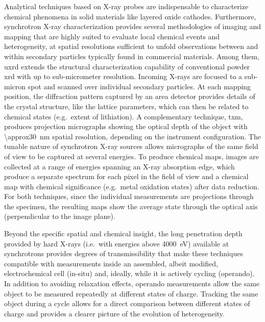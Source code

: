 \documentclass{article}
\begin{document}
Analytical techniques based on X-ray probes are indispensable to characterize chemical phenomena in solid materials like layered oxide cathodes\cite{doeff2017}. Furthermore, synchrotron X-ray characterization provides several methodologies of imaging and mapping that are highly suited to
evaluate local chemical events and heterogeneity\cite{wolf2017}, at spatial resolutions sufficient to unfold observations between and within secondary particles typically found in commercial materials. Among them, \gls{uxrd} extends the
structural characterization capability of conventional powder \gls{xrd} with
up to sub-micrometer resolution. Incoming X-rays are focused to a
sub-micron spot and scanned over individual secondary particles. At
each mapping position, the diffraction pattern captured by an area
detector provides details of the crystal structure, like the lattice
parameters, which can then be related to chemical states (e.g.\ extent
of lithiation). A complementary technique, \Gls{txm}, produces
projection micrographs showing the optical depth of the object with
\SI{\approx30}{nm} spatial resolution, depending on the instrument
configuration. The tunable nature of synchrotron X-ray sources allows
micrographs of the same field of view to be captured at several
energies. To produce chemical maps, images are collected at a range of
energies spanning an X-ray absorption edge, which produce a separate
spectrum for each pixel in the field of view and a chemical map with
chemical significance (e.g.\ metal oxidation states) after data
reduction. For both techniques, since the individual measurements are
projections through the specimen, the resulting maps show the average
state through the optical axis (perpendicular to the image plane).

Beyond the specific spatial and chemical insight, the long penetration depth provided by hard X-rays (i.e.\ with energies above \SI{4000}{\electronvolt}) available at synchrotrons provides degrees of transmissibility that make these techniques compatible with measurements inside an assembled, albeit modified, electrochemical cell (in-situ) and, ideally,
while it is actively cycling (operando). In addition to avoiding
relaxation effects, operando measurements allow the same object to be
measured repeatedly at different states of charge. Tracking the same
object during a cycle allows for a direct comparison
between different states of charge and provides a clearer picture of
the evolution of heterogeneity.

\end{document}
